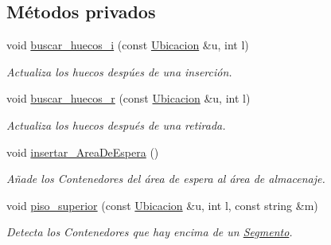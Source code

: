 \subsection*{Métodos privados}
\begin{DoxyCompactItemize}
\item 
void \hyperlink{class_terminal_a204fc08e3b6f13f75c525f282b023b19}{buscar\+\_\+huecos\+\_\+i} (const \hyperlink{class_ubicacion}{Ubicacion} \&u, int l)
\begin{DoxyCompactList}\small\item\em Actualiza los huecos despúes de una inserción. \end{DoxyCompactList}\item 
void \hyperlink{class_terminal_a56204987306ed811046d3ade11fff2cb}{buscar\+\_\+huecos\+\_\+r} (const \hyperlink{class_ubicacion}{Ubicacion} \&u, int l)
\begin{DoxyCompactList}\small\item\em Actualiza los huecos después de una retirada. \end{DoxyCompactList}\item 
void \hyperlink{class_terminal_a672932def16149bd23a95d60956e42a0}{insertar\+\_\+\+Area\+De\+Espera} ()
\begin{DoxyCompactList}\small\item\em Añade los Contenedores del área de espera al área de almacenaje. \end{DoxyCompactList}\item 
void \hyperlink{class_terminal_aeadd54221b7138f6b1b4e7d072723ffa}{piso\+\_\+superior} (const \hyperlink{class_ubicacion}{Ubicacion} \&u, int l, const string \&m)
\begin{DoxyCompactList}\small\item\em Detecta los Contenedores que hay encima de un \hyperlink{class_segmento}{Segmento}. \end{DoxyCompactList}\end{DoxyCompactItemize}

